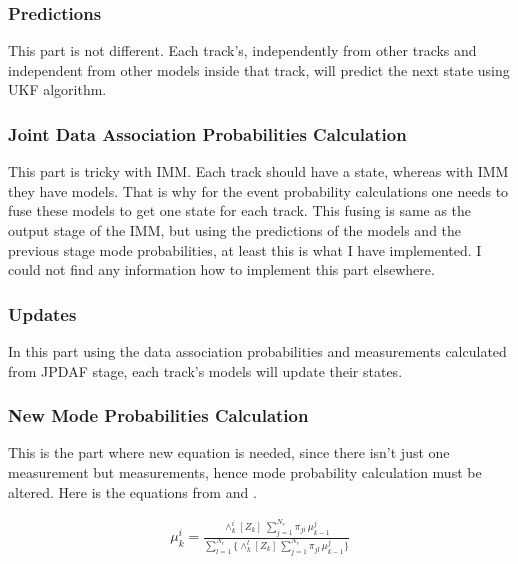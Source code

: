 \documentclass[peerreview]{IEEEtran}
\begin{document}
\vspace{10px}

\subsubsection{Predictions}
This part is not different. Each track's, independently from other tracks and independent from other models inside that track, will predict the next state using UKF algorithm.

\vspace{10px} 
 
\subsubsection{Joint Data Association Probabilities Calculation}
This part is tricky with IMM. Each track should have a state, whereas with IMM they have models. That is why for the event probability calculations one needs to fuse these models to get one state for each track. This fusing is same as the output stage of the IMM, but using the predictions of the models and the previous stage mode probabilities, at least this is what I have implemented. I could not find any information how to implement this part elsewhere.

\vspace{10px} 

\subsubsection{Updates}
In this part using the data association probabilities and measurements calculated from JPDAF stage, each track's models will update their states.

\vspace{10px}

\subsubsection{New Mode Probabilities Calculation}
This is the part where new equation is needed, since there isn't just one measurement but measurements, hence mode probability calculation must be altered. Here is the equations from \cite[p.211]{BYL95} and \cite[p.53]{AAR17}.

\begin{equation}
\begin{aligned}
\mu^i_k = \frac{\wedge^i_k[Z_k] \; \sum\limits_{j=1}^{N_r} \pi_{ji} \, \mu^j_{k-1}}{\sum\limits_{l=1}^{N_r} \{  \wedge^l_k[Z_k] \, \sum\limits_{j=1}^{N_r} \pi_{jl} \, \mu^j_{k-1} \} } 
\end{aligned}
\end{equation}
\end{document}

